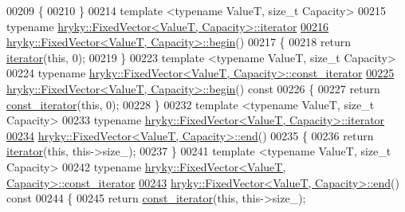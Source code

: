 \begin{DoxyCode}
00209 \{
00210 \}
00214 \textcolor{keyword}{template} <\textcolor{keyword}{typename} ValueT, \textcolor{keywordtype}{size\_t} Capacity>
00215 \textcolor{keyword}{typename} \hyperlink{classhryky_1_1iterator_1_1random_1_1_mutable}{hryky::FixedVector<ValueT, Capacity>::iterator}
\hypertarget{fixed__vector_8h_source_l00216}{}\hyperlink{classhryky_1_1_fixed_vector_ad90451d97fc185f8df9621dff03bbce8}{00216} \hyperlink{classhryky_1_1_fixed_vector}{hryky::FixedVector<ValueT, Capacity>::begin}()
00217 \{
00218     \textcolor{keywordflow}{return} \hyperlink{classhryky_1_1iterator_1_1random_1_1_mutable}{iterator}(\textcolor{keyword}{this}, 0);
00219 \}
00223 \textcolor{keyword}{template} <\textcolor{keyword}{typename} ValueT, \textcolor{keywordtype}{size\_t} Capacity>
00224 \textcolor{keyword}{typename} \hyperlink{classhryky_1_1iterator_1_1random_1_1_immutable}{hryky::FixedVector<ValueT, Capacity>::const_iterator}
\hypertarget{fixed__vector_8h_source_l00225}{}\hyperlink{classhryky_1_1_fixed_vector_a646c9c968a942f1e82cf554a085214ad}{00225} \hyperlink{classhryky_1_1_fixed_vector}{hryky::FixedVector<ValueT, Capacity>::begin}()\textcolor{keyword}{ const}
00226 \textcolor{keyword}{}\{
00227     \textcolor{keywordflow}{return} \hyperlink{classhryky_1_1iterator_1_1random_1_1_immutable}{const_iterator}(\textcolor{keyword}{this}, 0);
00228 \}
00232 \textcolor{keyword}{template} <\textcolor{keyword}{typename} ValueT, \textcolor{keywordtype}{size\_t} Capacity>
00233 \textcolor{keyword}{typename} \hyperlink{classhryky_1_1iterator_1_1random_1_1_mutable}{hryky::FixedVector<ValueT, Capacity>::iterator}
\hypertarget{fixed__vector_8h_source_l00234}{}\hyperlink{classhryky_1_1_fixed_vector_a7e78bde51c918d8032e3d835f43713fc}{00234} \hyperlink{classhryky_1_1_fixed_vector}{hryky::FixedVector<ValueT, Capacity>::end}()
00235 \{
00236     \textcolor{keywordflow}{return} \hyperlink{classhryky_1_1iterator_1_1random_1_1_mutable}{iterator}(\textcolor{keyword}{this}, this->size\_);
00237 \}
00241 \textcolor{keyword}{template} <\textcolor{keyword}{typename} ValueT, \textcolor{keywordtype}{size\_t} Capacity>
00242 \textcolor{keyword}{typename} \hyperlink{classhryky_1_1iterator_1_1random_1_1_immutable}{hryky::FixedVector<ValueT, Capacity>::const_iterator}
\hypertarget{fixed__vector_8h_source_l00243}{}\hyperlink{classhryky_1_1_fixed_vector_ab296636b3b2c466f3f3a8a38178a1491}{00243} \hyperlink{classhryky_1_1_fixed_vector}{hryky::FixedVector<ValueT, Capacity>::end}()\textcolor{keyword}{ const}
00244 \textcolor{keyword}{}\{
00245     \textcolor{keywordflow}{return} \hyperlink{classhryky_1_1iterator_1_1random_1_1_immutable}{const_iterator}(\textcolor{keyword}{this}, this->size\_);

\end{DoxyCode}
